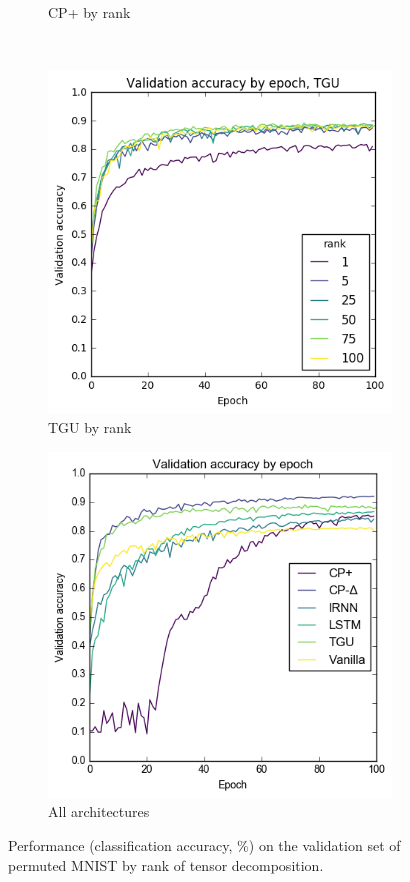 \begin{figure}
\begin{subfigure}[t]{0.45\textwidth}
	\caption{CP+ by rank}
	\label{fig:cp+rank}
\end{subfigure}\\
\begin{subfigure}[t]{0.45\textwidth}
	\includegraphics[width=\textwidth]{exps/mnist/tgurank}
	\caption{TGU by rank}
\end{subfigure}
\begin{subfigure}[t]{0.45\textwidth}
	\includegraphics[width=\textwidth]{exps/mnist/allarchs}
	\caption{All architectures}
\end{subfigure}

\caption[Permuted MNIST results]{Performance (classification accuracy, \%)
 on the validation set of permuted MNIST
by rank of tensor decomposition.}
\label{fig:pmnist}
\end{figure}

